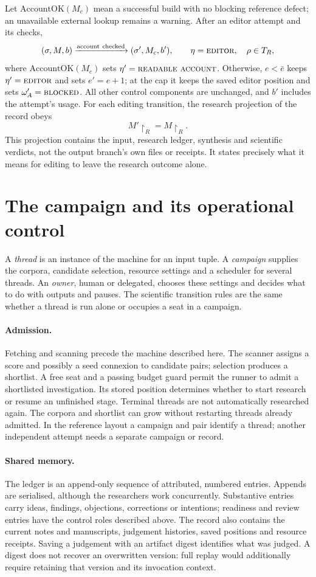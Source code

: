 \documentclass[11pt,a4paper]{article}
\newcommand{\st}[1]{\textsc{#1}}
\begin{document}
Let \(\mathrm{AccountOK}(M_c)\) mean a successful build with no blocking
reference defect; an unavailable external lookup remains a warning. After an
editor attempt and its checks,
\[
 (\sigma,M,b)\xrightarrow{\mathrm{account\ checked}}
 (\sigma',M_c,b'),\qquad \eta=\st{editor},\quad\rho\in T_R,
\]
where \(\mathrm{AccountOK}(M_c)\) sets \(\eta'=\st{readable\ account}\).
Otherwise, \(e<\bar e\) keeps \(\eta'=\st{editor}\) and sets \(e'=e+1\); at the
cap it keeps the saved editor position and sets \(\omega_A'=\st{blocked}\). All
other control components are unchanged, and \(b'\) includes the attempt's usage.
For each editing transition, the research projection of the record obeys
\[
  M'\!\restriction_R=M\!\restriction_R.
\]
This projection contains the input, research ledger, synthesis and scientific
verdicts, not the output branch's own files or receipts. It states precisely
what it means for editing to leave the research outcome alone.

\section{The campaign and its operational control}

A \emph{thread} is an instance of the machine for an input tuple. A
\emph{campaign} supplies the corpora, candidate selection, resource settings and
a scheduler for several threads. An \emph{owner}, human or delegated, chooses
these settings and decides what to do with outputs and pauses. The scientific
transition rules are the same whether a thread is run alone or occupies a seat
in a campaign.

\paragraph{Admission.}
Fetching and scanning precede the machine described here. The scanner assigns a
score and possibly a seed connexion to candidate pairs; selection produces a
shortlist. A free seat and a passing budget guard permit the runner to admit a
shortlisted investigation. Its stored position determines whether to start
research or resume an unfinished stage. Terminal threads are not automatically
researched again. The corpora and shortlist can grow without restarting threads
already admitted. In the reference layout a campaign and pair identify a thread;
another independent attempt needs a separate campaign or record.

\paragraph{Shared memory.}
The ledger is an append-only sequence of attributed, numbered entries. Appends
are serialised, although the researchers work concurrently. Substantive entries
carry ideas, findings, objections, corrections or intentions; readiness and
review entries have the control roles described above. The record also contains
the current notes and manuscripts, judgement histories, saved positions and
resource receipts. Saving a judgement with an artifact digest identifies what
was judged. A digest does not recover an overwritten version: full replay would
additionally require retaining that version and its invocation context.
\end{document}
